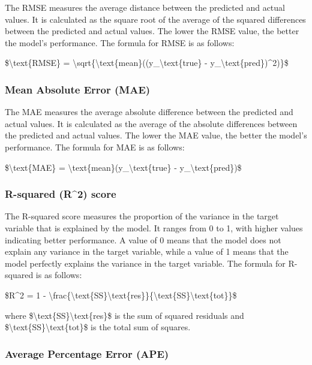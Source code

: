 The RMSE measures the average distance between the predicted and actual
values. It is calculated as the square root of the average of the
squared differences between the predicted and actual values. The lower
the RMSE value, the better the model's performance. The formula for RMSE
is as follows:

\$\textbackslash text\{RMSE\} =
\textbackslash sqrt\{\textbackslash text\{mean\}((y\_\textbackslash text\{true\}
- y\_\textbackslash text\{pred\})\^{}2)\}\$

\hypertarget{mean-absolute-error-mae}{%
\subsubsection{Mean Absolute Error
(MAE)}\label{mean-absolute-error-mae}}

The MAE measures the average absolute difference between the predicted
and actual values. It is calculated as the average of the absolute
differences between the predicted and actual values. The lower the MAE
value, the better the model's performance. The formula for MAE is as
follows:

\$\textbackslash text\{MAE\} =
\textbackslash text\{mean\}(\textbar y\_\textbackslash text\{true\} -
y\_\textbackslash text\{pred\}\textbar)\$

\hypertarget{r-squared-r2-score}{%
\subsubsection{R-squared (R\^{}2) score}\label{r-squared-r2-score}}

The R-squared score measures the proportion of the variance in the
target variable that is explained by the model. It ranges from 0 to 1,
with higher values indicating better performance. A value of 0 means
that the model does not explain any variance in the target variable,
while a value of 1 means that the model perfectly explains the variance
in the target variable. The formula for R-squared is as follows:

\$R\^{}2 = 1 -
\textbackslash frac\{\textbackslash text\{SS\}\textbackslash text\{res\}\}\{\textbackslash text\{SS\}\textbackslash text\{tot\}\}\$

where \$\textbackslash text\{SS\}\textbackslash text\{res\}\$ is the sum
of squared residuals and
\$\textbackslash text\{SS\}\textbackslash text\{tot\}\$ is the total sum
of squares.

\hypertarget{average-percentage-error-ape}{%
\subsubsection{Average Percentage Error
(APE)}\label{average-percentage-error-ape}}

